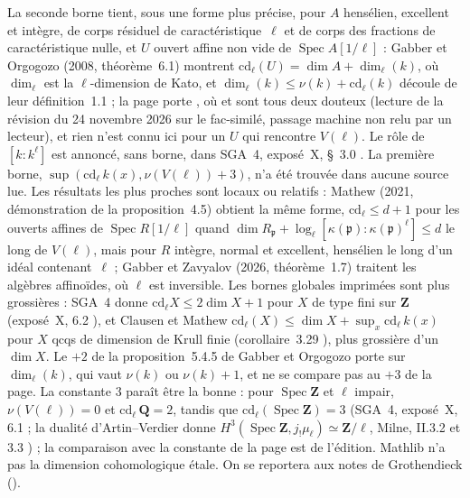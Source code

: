 {\small La seconde borne tient, sous une forme plus précise, pour $A$ hensélien, excellent et intègre, de corps résiduel de caractéristique~$\ell$ et de corps des fractions de caractéristique nulle, et $U$ ouvert affine non vide de $\operatorname{Spec} A[1/\ell]$ : Gabber et Orgogozo (2008, théorème~6.1) \cite{gabberorgogozo2008} montrent $\mathrm{cd}_\ell(U) = \dim A + \dim_\ell(k)$, où $\dim_\ell$ est la $\ell$-dimension de Kato, et $\dim_\ell(k) \leq \nu(k) + \mathrm{cd}_\ell(k)$ découle de leur définition~1.1 ; la page porte , où  et  sont tous deux douteux (lecture de la révision du 24 novembre 2026 sur le fac-similé, passage machine non relu par un lecteur), et rien n'est connu ici pour un $U$ qui rencontre $V(\ell)$. Le rôle de $[k : k^\ell]$ est annoncé, sans borne, dans SGA~4, exposé~X, §~3.0 \cite{sga4-3}. La première borne, $\sup(\mathrm{cd}_\ell\, k(x), \nu(V(\ell)) + 3)$, n'a été trouvée dans aucune source lue. Les résultats les plus proches sont locaux ou relatifs : Mathew (2021, démonstration de la proposition~4.5) \cite{mathew2021} obtient la même forme, $\mathrm{cd}_\ell \leq d + 1$ pour les ouverts affines de $\operatorname{Spec} R[1/\ell]$ quand $\dim R_{\mathfrak p} + \log_\ell [\kappa(\mathfrak p) : \kappa(\mathfrak p)^\ell] \leq d$ le long de $V(\ell)$, mais pour $R$ intègre, normal et excellent, hensélien le long d'un idéal contenant~$\ell$ ; Gabber et Zavyalov (2026, théorème~1.7) \cite{gabberzavyalov2026} traitent les algèbres affinoïdes, où $\ell$ est inversible. Les bornes globales imprimées sont plus grossières : SGA~4 donne $\mathrm{cd}_\ell X \leq 2 \dim X + 1$ pour $X$ de type fini sur $\mathbf Z$ (exposé~X, 6.2 \cite{sga4-3}), et Clausen et Mathew $\mathrm{cd}_\ell(X) \leq \dim X + \sup_x \mathrm{cd}_\ell\, k(x)$ pour $X$ qcqs de dimension de Krull finie (corollaire~3.29 \cite{clausenmathew2021}), plus grossière d'un $\dim X$. Le $+2$ de la proposition~5.4.5 de Gabber et Orgogozo porte sur $\dim_\ell(k)$, qui vaut $\nu(k)$ ou $\nu(k) + 1$, et ne se compare pas au $+3$ de la page. La constante $3$ paraît être la bonne : pour $\operatorname{Spec}\mathbf Z$ et $\ell$ impair, $\nu(V(\ell)) = 0$ et $\mathrm{cd}_\ell\,\mathbf Q = 2$, tandis que $\mathrm{cd}_\ell(\operatorname{Spec}\mathbf Z) = 3$ (SGA~4, exposé~X, 6.1 \cite{sga4-3} ; la dualité d'Artin--Verdier donne $H^3(\operatorname{Spec}\mathbf Z, j_!\mu_\ell) \simeq \mathbf Z/\ell$, Milne, II.3.2 et 3.3 \cite{milne2006}) ; la comparaison avec la constante de la page est de l'édition. Mathlib n'a pas la dimension cohomologique étale. On se reportera aux notes de Grothendieck ().\par}

